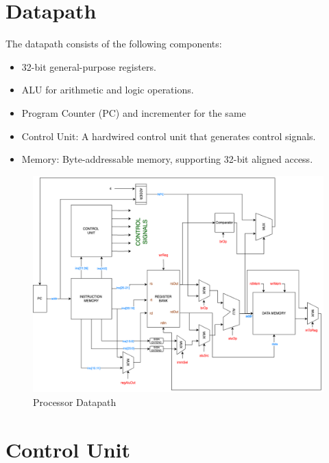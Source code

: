 \documentclass{article}
\begin{document}
\section{Datapath}
The datapath consists of the following components:
\begin{itemize}
    \item 32-bit general-purpose registers.
    \item ALU for arithmetic and logic operations.
    \item Program Counter (PC) and incrementer for the same
    \item Control Unit: A hardwired control unit that generates control signals.
    \item Memory: Byte-addressable memory, supporting 32-bit aligned access.
\end{itemize}
\begin{figure}[H]
    \centering
    \includegraphics[width=\textwidth]{datapath.png}
    \caption{Processor Datapath}
\end{figure}

\section{Control Unit}
\end{document}
